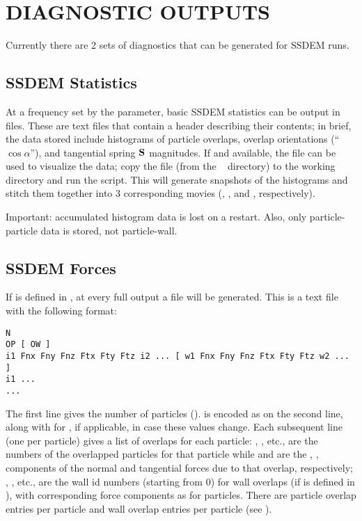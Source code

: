 \section{DIAGNOSTIC OUTPUTS}

Currently there are 2 sets of diagnostics that can be generated for
SSDEM runs.

\subsection{SSDEM Statistics}

At a frequency set by the  parameter, basic
SSDEM statistics can be output in  files.  These are
text files that contain a header describing their contents; in brief,
the data stored include histograms of particle overlaps, overlap
orientations (``$\cos{\alpha}$''), and tangential spring $\mathbf{S}$
magnitudes.  If  and  available, the file
 can be used to visualize the data; copy the file
(from the \pkd\  directory) to the working directory and run
the  script.  This will generate snapshots of the
histograms and stitch them together into 3 corresponding movies
(, , and
, respectively).

Important: accumulated histogram data is lost on a restart.  Also,
only particle-particle data is stored, not particle-wall.

\subsection{SSDEM Forces}

If  is defined in , at every
full  output a  file will be generated.  This
is a text file with the following format:
\begin{verbatim}
N
OP [ OW ]
i1 Fnx Fny Fnz Ftx Fty Ftz i2 ... [ w1 Fnx Fny Fnz Ftx Fty Ftz w2 ... ]
i1 ...
...
\end{verbatim}
The first line gives the number of particles ().
 is encoded as  on
the second line, along with  for
, if applicable,
in case these values change.  Each subsequent line (one per particle)
gives a list of overlaps for each particle: , ,
etc., are the  numbers of the overlapped particles for
that particle while  and  are the ,
,  components of the normal and tangential forces due
to that overlap, respectively; , , etc., are the
wall id numbers (starting from 0) for wall overlaps (if
 is defined in ), with
corresponding force components as for particles.  There are 
particle overlap entries per particle and  wall overlap
entries per particle (see ).

